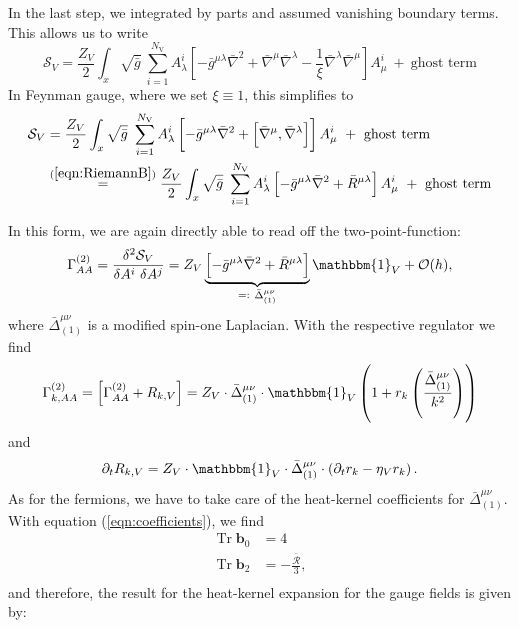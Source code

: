 In the last step, we integrated by parts and assumed vanishing boundary terms.\\
 This allows us to write 
\begin{equation}
\mathcal{S}_V = \frac{Z_{V}}{2} \int_x \sqrt{\bar{g}} \ \sum\limits_{i=1}^{N_{\text{V}}} A_{\lambda}^{i}\left[ - \bar{g}^{\mu\lambda}\bar{\nabla}^2 +  \bar{\nabla}^{\mu}\bar{\nabla}^{\lambda} - \frac{1}{\xi} \bar{\nabla}^{\lambda}\bar{\nabla}^{\mu}\right]A_{\mu}^{i} \ + \ \text{ghost term}
\end{equation}
In Feynman gauge, where we set $\xi \equiv 1$, this simplifies to
\begin{equation}
\begin{aligned}
\mathcal{S}_V &= \frac{Z_{V}}{2} \int_x \sqrt{\bar{g}} \ \sum\limits_{i=1}^{N_{\text{V}}} A_{\lambda}^{i}\left[ - \bar{g}^{\mu\lambda}\bar{\nabla}^2 +  \left[\bar{\nabla}^{\mu}, \bar{\nabla}^{\lambda}\right]\right]A_{\mu}^{i} \ + \ \text{ghost term} \\
&\overset{(\mathrm{\ref{eqn:RiemannB}})}{=} \frac{Z_{V}}{2} \int_x \sqrt{\bar{g}} \ \sum\limits_{i=1}^{N_{\text{V}}} A_{\lambda}^{i}\left[ - \bar{g}^{\mu\lambda}\bar{\nabla}^2 +  \bar{R}^{\mu\lambda}\right]A_{\mu}^{i} \ + \ \text{ghost term}
\end{aligned}
\end{equation}

In this form, we are again directly able to read off the two-point-function:
\begin{equation}
	\Gamma^{(2)}_{AA} = \frac{\delta^2 \mathcal{S}_V}{\delta A^{i}\ \delta A^{j}} = Z_V\underbrace{\left[ - \bar{g}^{\mu\lambda}\bar{\nabla}^2 +  \bar{R}^{\mu\lambda}\right]}_{=: \  \bar{\Delta}^{\mu\nu}_{(1)}}\mathbbm{1}_V + \mathcal{O}(h),
\end{equation} 
where $\bar{\Delta}^{\mu\nu}_{(1)}$ is a modified spin-one Laplacian. With the respective regulator we find
\begin{align}
	\Gamma^{(2)}_{k, AA} = \left[\Gamma^{(2)}_{AA}+ R_{k, V}\right]  = Z_V \cdot\bar{\Delta}_{(1)}^{\mu\nu}\cdot\mathbbm{1}_V\left(1 + r_k\left(\frac{\bar{\Delta}_{(1)}^{\mu\nu}}{k^2}\right)\right)
\end{align}
and 
\begin{align}
	\partial_t R_{k, V} = Z_V\cdot\mathbbm{1}_V\cdot\bar{\Delta}_{(1)}^{\mu\nu}\cdot\left(\partial_t r_k - \eta_V r_k\right).
\end{align}
As for the fermions, we have to take care of the heat-kernel coefficients for $\bar{\Delta}^{\mu\nu}_{(1)}$. With equation (\ref{eqn:coefficients}), we find 
\begin{equation}
\begin{aligned}
	\operatorname{Tr}\mathbf{b}_0 &= 4 \\
	\operatorname{Tr}\mathbf{b}_2 &= -\frac{\bar{\mathcal{R}}}{3}, \\
\end{aligned} 
\end{equation}
and therefore, the result for the heat-kernel expansion for the gauge fields is given by:

